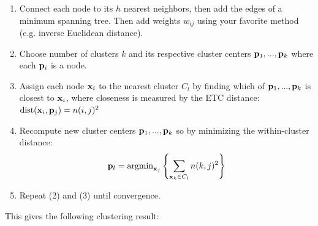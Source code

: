 \documentclass[./some_latex_template.tex]{subfiles}
\begin{document}
\begin{enumerate}
	\item Connect each node to its $h$ nearest neighbors, then add the edges of a minimum spanning tree. Then add weights $w_{ij}$ using your favorite method (e.g. inverse Euclidean distance). 
	\item Choose number of clusters $k$ and its respective cluster centers $\mathbf{p}_1,...,\mathbf{p}_k$ where each $\mathbf{p}_i$ is a node.
	\item Assign each node $\mathbf{x}_i$ to the nearest cluster $C_l$ by finding which of $\mathbf{p}_1,...,\mathbf{p}_k$ is closest to $\mathbf{x}_i$, where closeness is measured by the ETC distance: $\mathop{\rm dist}\nolimits(\mathbf{x}_i, \mathbf{p}_j) = n(i, j)^2$ 
	\item Recompute new cluster centers $\mathbf{p}_1,...,\mathbf{p}_k$ so by minimizing the within-cluster distance:
	\begin{align*}
		\mathbf{p}_l = \mathop{\rm argmin}\nolimits_{\mathbf{x}_j} \left\{ \sum_{\mathbf{x}_k \in C_l}n(k, j)^2 \right\}
	\end{align*}
	\item Repeat (2) and (3) until convergence. 
\end{enumerate}

\noindent This gives the following clustering result:
\end{document}
